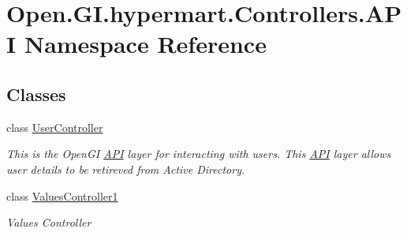 \hypertarget{namespace_open_1_1_g_i_1_1hypermart_1_1_controllers_1_1_a_p_i}{}\section{Open.\+G\+I.\+hypermart.\+Controllers.\+A\+P\+I Namespace Reference}
\label{namespace_open_1_1_g_i_1_1hypermart_1_1_controllers_1_1_a_p_i}
\subsection*{Classes}
\begin{DoxyCompactItemize}
\item 
class \hyperlink{class_open_1_1_g_i_1_1hypermart_1_1_controllers_1_1_a_p_i_1_1_user_controller}{User\+Controller}
\begin{DoxyCompactList}\small\item\em This is the Open\+G\+I \hyperlink{namespace_open_1_1_g_i_1_1hypermart_1_1_controllers_1_1_a_p_i}{A\+P\+I} layer for interacting with users. This \hyperlink{namespace_open_1_1_g_i_1_1hypermart_1_1_controllers_1_1_a_p_i}{A\+P\+I} layer allows user details to be retireved from Active Directory. \end{DoxyCompactList}\item 
class \hyperlink{class_open_1_1_g_i_1_1hypermart_1_1_controllers_1_1_a_p_i_1_1_values_controller1}{Values\+Controller1}
\begin{DoxyCompactList}\small\item\em Values Controller \end{DoxyCompactList}\end{DoxyCompactItemize}
